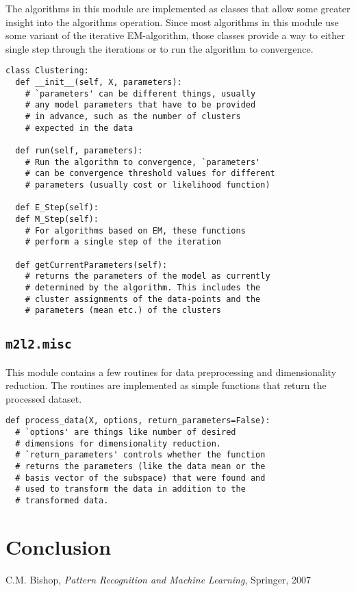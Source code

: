 \documentclass[a4paper]{article}
\begin{document}
The algorithms in this module are implemented as classes that allow some greater insight into the algorithms operation. Since most algorithms in this module use some variant of the iterative EM-algorithm, those classes provide a way to either single step through the iterations or to run the algorithm to convergence.

\begin{lstlisting}[frame=TLbr,breaklines=true]
class Clustering:
  def __init__(self, X, parameters):
    # `parameters' can be different things, usually
    # any model parameters that have to be provided
    # in advance, such as the number of clusters
    # expected in the data
  
  def run(self, parameters):
    # Run the algorithm to convergence, `parameters'
    # can be convergence threshold values for different
    # parameters (usually cost or likelihood function)
  
  def E_Step(self):
  def M_Step(self):
    # For algorithms based on EM, these functions
    # perform a single step of the iteration
    
  def getCurrentParameters(self):
    # returns the parameters of the model as currently
    # determined by the algorithm. This includes the
    # cluster assignments of the data-points and the
    # parameters (mean etc.) of the clusters
\end{lstlisting}

\subsection{\texttt{m2l2.misc}}
This module contains a few routines for data preprocessing and dimensionality reduction. The routines are implemented as simple functions that return the processed dataset.

\begin{lstlisting}[frame=TLbr,breaklines=true]
def process_data(X, options, return_parameters=False):
  # `options' are things like number of desired
  # dimensions for dimensionality reduction.
  # `return_parameters' controls whether the function
  # returns the parameters (like the data mean or the
  # basis vector of the subspace) that were found and
  # used to transform the data in addition to the
  # transformed data.
\end{lstlisting}


\section{Conclusion}


\begin{thebibliography}{9}
 C.M. Bishop, \emph{Pattern Recognition and Machine Learning}, Springer, 2007

\end{thebibliography}
\end{document}
